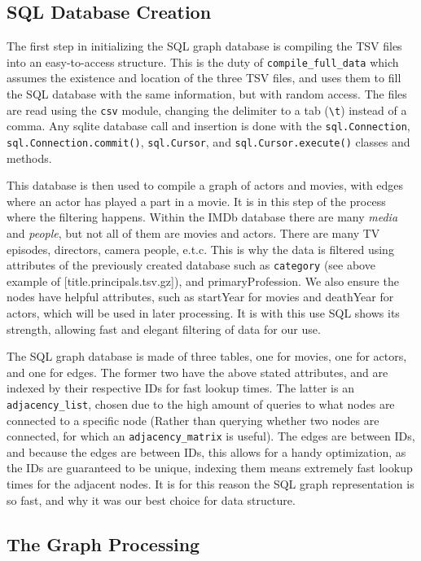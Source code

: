 \documentclass{article}
\begin{document}
\subsection{SQL Database Creation}

The first step in initializing the SQL graph database is compiling the TSV files into an easy-to-access structure. This is the duty of \verb!compile_full_data! which assumes the existence and location of the three TSV files, and uses them to fill the SQL database with the same information, but with random access. The files are read using the \verb!csv! module, changing the delimiter to a tab (\verb!\t!) instead of a comma. Any sqlite database call and insertion is done with the \verb!sql.Connection!, \verb!sql.Connection.commit()!, \verb!sql.Cursor!, and \verb!sql.Cursor.execute()! classes and methods.

This database is then used to compile a graph of actors and movies, with edges where an actor has played a part in a movie. It is in this step of the process where the filtering happens. Within the IMDb database there are many \emph{media} and \emph{people}, but not all of them are movies and actors. There are many TV episodes, directors, camera people, e.t.c. This is why the data is filtered using attributes of the previously created database such as \verb+category+ (see above example of [title.principals.tsv.gz]), and primaryProfession. We also ensure the nodes have helpful attributes, such as startYear for movies and deathYear for actors, which will be used in later processing. It is with this use SQL shows its strength, allowing fast and elegant filtering of data for our use. 

The SQL graph database is made of three tables, one for movies, one for actors, and one for edges. The former two have the above stated attributes, and are indexed by their respective IDs for fast lookup times. The latter is an \verb+adjacency_list+, chosen due to the high amount of queries to what nodes are connected to a specific node (Rather than querying whether two nodes are connected, for which an \verb+adjacency_matrix+ is useful). The edges are between IDs, and because the edges are between IDs, this allows for a handy optimization, as the IDs are guaranteed to be unique, indexing them means extremely fast lookup times for the adjacent nodes. It is for this reason the SQL graph representation is so fast, and why it was our best choice for data structure.

\subsection{The Graph Processing}
\end{document}

